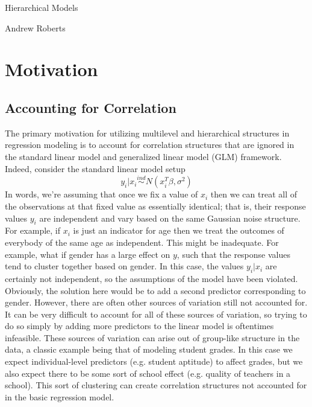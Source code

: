 \documentclass[12pt]{article}
\begin{document}
\begin{center}
\Large
Hierarchical Models
\end{center}

\begin{flushright}
Andrew Roberts
\end{flushright} 

\section{Motivation}

\subsection{Accounting for Correlation}
The primary motivation for utilizing multilevel and hierarchical structures in regression modeling is to account for correlation structures that are ignored in the standard linear model and generalized 
linear model (GLM) framework. Indeed, consider the standard linear model setup 
\[y_i|x_i \overset{ind}{\sim} N(x_i^T \beta, \sigma^2)\]
In words, we're assuming that once we fix a value of $x_i$ then we can treat all of the observations at that fixed value as essentially identical; that is, their response values $y_i$ are independent 
and vary based on the same Gaussian noise structure. For example, if $x_i$ is just an indicator for age then we treat the outcomes of everybody of the same age as independent. This might be inadequate. 
For example, what if gender has a large effect on $y$, such that the response values tend to cluster together based on gender. In this case, the values $y_i|x_i$ are certainly not independent, so the assumptions
of the model have been violated. Obviously, the solution here would be to add a second predictor corresponding to gender. However, there are often other sources of variation still not accounted for. It can be very 
difficult to account for all of these sources of variation, so trying to do so simply by adding more predictors to the linear model is oftentimes infeasible. These sources of variation can arise out of 
group-like structure in the data, a classic example being that of modeling student grades. In this case we expect individual-level predictors (e.g. student aptitude) to affect grades, but we also 
expect there to be some sort of school effect (e.g. quality of teachers in a school). This sort of clustering can create correlation structures not accounted for in the basic regression model.  
\end{document}
